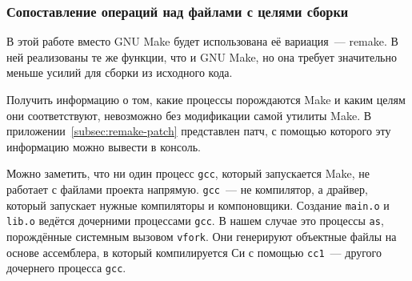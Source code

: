 \subsubsection{Сопоставление операций над файлами с целями сборки}
\label{subsec:link-ops-with-targets}

В этой работе вместо GNU Make будет использована её вариация~--- remake. В ней реализованы те же функции, что и GNU Make, но она требует значительно меньше усилий для сборки из исходного кода.

Получить информацию о том, какие процессы порождаются Make и каким целям они соответствуют, невозможно без модификации самой утилиты Make. В приложении~\ref{subsec:remake-patch} представлен патч, с помощью которого эту информацию можно вывести в консоль.



Можно заметить, что ни один процесс \texttt{gcc}, который запускается Make, не работает с файлами проекта напрямую. \texttt{gcc}~--- не компилятор, а драйвер, который запускает нужные компиляторы и компоновщики. Создание \texttt{main.o} и \texttt{lib.o} ведётся дочерними процессами \texttt{gcc}. В нашем случае это процессы \texttt{as}, порождённые системным вызовом \texttt{vfork}. Они генерируют объектные файлы на основе ассемблера, в который компилируется Си с помощью \texttt{cc1}~--- другого дочернего процесса \texttt{gcc}.

